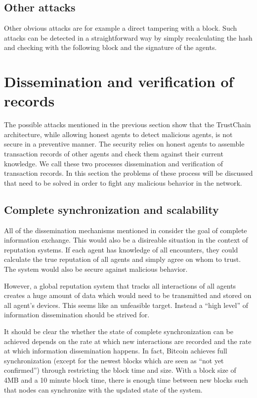 \subsection{Other attacks}
Other obvious attacks are for example a direct tampering with a block. Such attacks can be 
detected in a straightforward way by simply recalculating the hash and checking with the following 
block and the signature of the agents.

\section{Dissemination and verification of records}
The possible attacks mentioned in the previous section show that the TrustChain architecture, while
allowing honest agents to detect malicious agents, is not secure in a preventive manner. The security
relies on honest agents to assemble transaction records of other agents and check them against their
current knowledge. We call these two processes dissemination and verification of transaction records.
In this section the problems of these process will be discussed that need to be solved in order to 
fight any malicious behavior in the network.

\subsection{Complete synchronization and scalability}
All of the dissemination mechanisms mentioned in \cite{hedetniemi1988survey} consider the goal of
complete information exchange. This would also be a disireable situation in the context of reputation
systems. If each agent has knowledge of all encounters, they could calculate the true reputation of
all agents and simply agree on whom to trust. The system would also be secure against malicious 
behavior. 

However, a global reputation system that tracks all interactions of all agents creates a huge amount
of data which would need to be transmitted and stored on all agent's devices. This seems like an
unfeasible target. Instead a ``high level'' of information dissemination should be strived for.

It should be clear the whether the state of complete synchronization can be achieved depends on the
rate at which new interactions are recorded and the rate at which information dissemination happens.
In fact, Bitcoin achieves full synchronization (except for the newest blocks which are seen as ``not
yet confirmed'') through restricting the block time and size. With a block size of 4MB and a 10 minute
block time, there is enough time between new blocks such that nodes can synchronize with the updated
state of the system.

